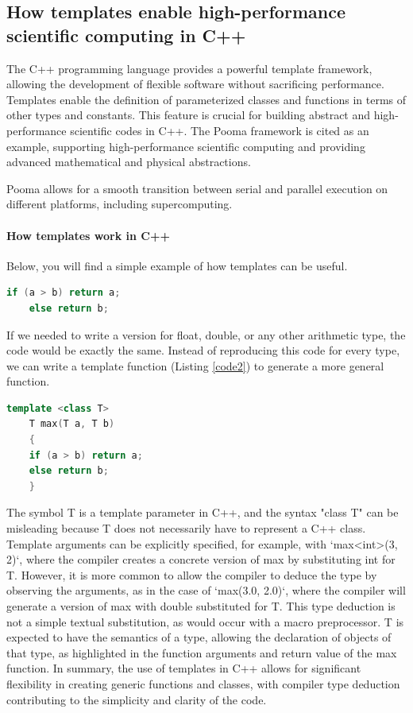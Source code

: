 \documentclass[11pt]{article}
\begin{document}
\begin{multicols*}{2}[\columnsep=1cm]
    \section{How templates enable high-performance scientific computing in C++}
    The C++ programming language provides a powerful template framework, allowing the development of flexible software without sacrificing performance. Templates enable the definition of parameterized classes and functions in terms of other types and constants. This feature is crucial for building abstract and high-performance scientific codes in C++. The Pooma framework is cited as an example, supporting high-performance scientific computing and providing advanced mathematical and physical abstractions.
    
    Pooma allows for a smooth transition between serial and parallel execution on different platforms, including supercomputing.
    
    \paragraph{How templates work in C++}
    Below, you will find a simple example of how templates can be useful.
    \begin{lstlisting}[language=C++, label=code1, caption={Max function without template}]
    if (a > b) return a;
    else return b;
    \end{lstlisting}
    If we needed to write a version for float, double, or any other arithmetic type, the code would be exactly the same. Instead of reproducing this code for every type, we can write a template function (Listing \ref{code2}) to generate a more general function.
    
    \begin{lstlisting}[language=C++, label=code2, caption={Max function with template}]
    template <class T>
    T max(T a, T b)
    {
    if (a > b) return a;
    else return b;
    }
    \end{lstlisting}
    
    The symbol T is a template parameter in C++, and the syntax "class T" can be misleading because T does not necessarily have to represent a C++ class. Template arguments can be explicitly specified, for example, with `max<int>(3, 2)`, where the compiler creates a concrete version of max by substituting int for T. However, it is more common to allow the compiler to deduce the type by observing the arguments, as in the case of `max(3.0, 2.0)`, where the compiler will generate a version of max with double substituted for T.
    This type deduction is not a simple textual substitution, as would occur with a macro preprocessor. T is expected to have the semantics of a type, allowing the declaration of objects of that type, as highlighted in the function arguments and return value of the max function. In summary, the use of templates in C++ allows for significant flexibility in creating generic functions and classes, with compiler type deduction contributing to the simplicity and clarity of the code.


\end{multicols*}
\end{document}
